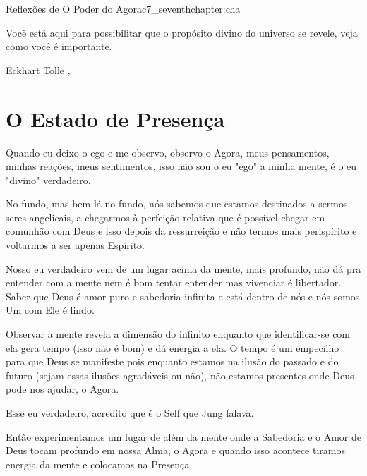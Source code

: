 \begin{chapterpage}{Reflexões de O Poder do Agora}{c7_seventhchapter:cha}

\begin{myquotation} Você está aqui para possibilitar que o propósito divino do universo se revele, veja como você é importante. 
\par\vspace*{15mm}
\mbox{}\hfill \emdash{}Eckhart Tolle 
, %
\par\end{myquotation}

\end{chapterpage}



\section{O Estado de Presença}\label{c1_basicformatting:sec}

\emdash{}Quando eu deixo o ego e me observo, observo o Agora, meus pensamentos, minhas reações, meus sentimentos, isso não sou o eu "ego" a minha mente, é o eu "divino" verdadeiro. 

\emdash{}No fundo, mas bem lá no fundo, nós sabemos que estamos destinados a sermos seres angelicais, a chegarmos à perfeição relativa que é possível chegar em comunhão com Deus e isso depois da ressurreição e não termos mais perispírito e voltarmos a ser apenas Espírito. 

\emdash{}Nosso eu verdadeiro vem de um lugar acima da mente, mais profundo, não dá pra entender com a mente nem é bom tentar entender mas vivenciar é libertador. Saber que Deus é amor puro e sabedoria infinita e está dentro de nós e nós somos Um com Ele é lindo. 

\emdash{}Observar a mente revela a dimensão do infinito enquanto que identificar-se com ela gera tempo (isso não é bom) e dá energia a ela. O tempo é um empecilho para que Deus se manifeste pois enquanto estamos na ilusão do passado e do futuro (sejam essas ilusões agradáveis ou não), não estamos presentes onde Deus pode nos ajudar, o Agora. 

\emdash{}Esse eu verdadeiro, acredito que é o Self que Jung falava. 


\emdash{}Então experimentamos um lugar de além da mente onde a Sabedoria e o Amor de Deus tocam profundo em nossa Alma, o Agora e quando isso acontece tiramos energia da mente e colocamos na Presença. 


